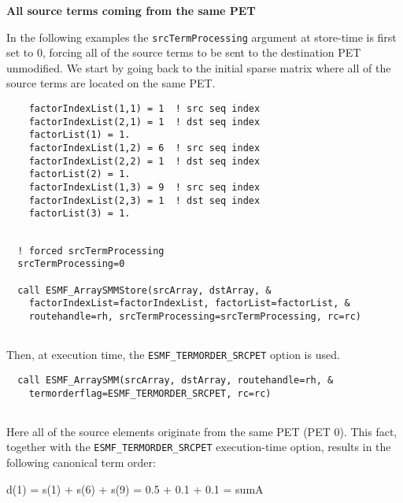    {\bf All source terms coming from the same PET}
  
   In the following examples the {\tt srcTermProcessing} argument at store-time
   is first set to 0, forcing all of the source terms to be sent to the
   destination PET unmodified. We start by going back to the initial sparse
   matrix where all of the source terms are located on the same PET. 

 \begin{verbatim}
    factorIndexList(1,1) = 1  ! src seq index
    factorIndexList(2,1) = 1  ! dst seq index
    factorList(1) = 1.
    factorIndexList(1,2) = 6  ! src seq index
    factorIndexList(2,2) = 1  ! dst seq index
    factorList(2) = 1.
    factorIndexList(1,3) = 9  ! src seq index
    factorIndexList(2,3) = 1  ! dst seq index
    factorList(3) = 1.
 
\end{verbatim}
 

 \begin{verbatim}
  ! forced srcTermProcessing
  srcTermProcessing=0
  
  call ESMF_ArraySMMStore(srcArray, dstArray, &
    factorIndexList=factorIndexList, factorList=factorList, &
    routehandle=rh, srcTermProcessing=srcTermProcessing, rc=rc)
 
\end{verbatim}
 

   Then, at execution time, the {\tt ESMF\_TERMORDER\_SRCPET} option is used. 

 \begin{verbatim}
  call ESMF_ArraySMM(srcArray, dstArray, routehandle=rh, &
    termorderflag=ESMF_TERMORDER_SRCPET, rc=rc)
 
\end{verbatim}
 

   Here all of the source elements originate from the same PET (PET 0). This
   fact, together with the {\tt ESMF\_TERMORDER\_SRCPET} execution-time option,
   results in the following canonical term order:
  
       d(1) = s(1) + s(6) + s(9) = 0.5 + 0.1 + 0.1 = sumA
  
